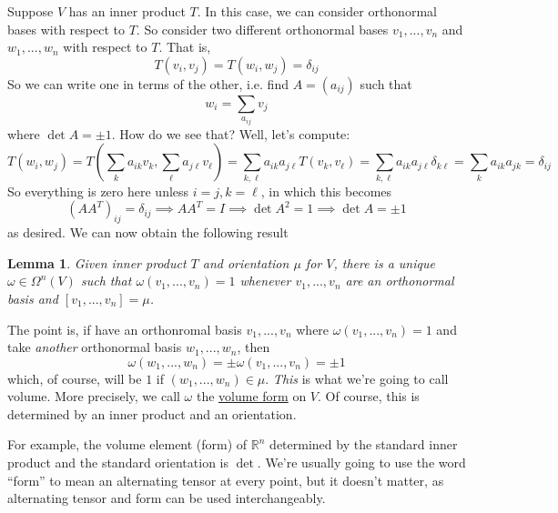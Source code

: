 \documentclass{article}
\newtheorem{lemma}{Lemma}
\newcommand{\reals}[0]{\mathbb{R}}
\begin{document}
Suppose \(V\) has an inner product \(T\). In this case, we can consider orthonormal bases with respect to \(T\). So consider two different orthonormal bases \(v_1,...,v_n\) and \(w_1,...,w_n\) with respect to \(T\). That is,
\begin{equation}
  T(v_i, v_j) = T(w_i, w_j) = \delta_{ij}
\end{equation}
So we can write one in terms of the other, i.e. find \(A = (a_{ij})\) such that
\begin{equation}
  w_i = \sum_{a_{ij}}v_j
\end{equation}
where \(\det A = \pm 1\). How do we see that? Well, let's compute:
\begin{equation}
  T(w_i, w_j) = T\left(\sum_ka_{ik}v_k, \sum_\ell a_{j\ell}v_\ell\right) = \sum_{k, \ell}a_{ik}a_{j\ell}T(v_k, v_\ell) = \sum_{k, \ell}a_{ik}a_{j\ell}\delta_{k\ell} = \sum_ka_{ik}a_{jk} = \delta_{ij}
\end{equation}
So everything is zero here unless \(i = j, k = \ell\), in which this becomes
\begin{equation}
  (AA^T)_{ij} = \delta_{ij} \implies AA^T = I \implies \det A^2 = 1 \implies \det A = \pm 1
\end{equation}
as desired. We can now obtain the following result
\begin{lemma}
  Given inner product \(T\) and orientation \(\mu\) for \(V\), there is a unique \(\omega \in \Omega^n(V)\) such that \(\omega(v_1,...,v_n) = 1\) whenever \(v_1,...,v_n\) are an orthonormal basis and \([v_1,...,v_n] = \mu\).
\end{lemma}
The point is, if have an orthonromal basis \(v_1,...,v_n\) where \(\omega(v_1,...,v_n) = 1\) and take \textit{another} orthonormal basis \(w_1,...,w_n\), then
\begin{equation}
  \omega(w_1,...,w_n) = \pm\omega(v_1,...,v_n) = \pm 1
\end{equation}
which, of course, will be \(1\) if \((w_1,...,w_n) \in \mu\).
\textit{This} is what we're going to call volume. More precisely, we call \(\omega\) the \underline{volume form} on \(V\). Of course, this is determined by an inner product and an orientation.

For example, the volume element (form) of \(\reals^n\) determined by the standard inner product and the standard orientation is \(\det\).
We're usually going to use the word ``form'' to mean an alternating tensor at every point, but it doesn't matter, as alternating tensor and form can be used interchangeably.
\end{document}
